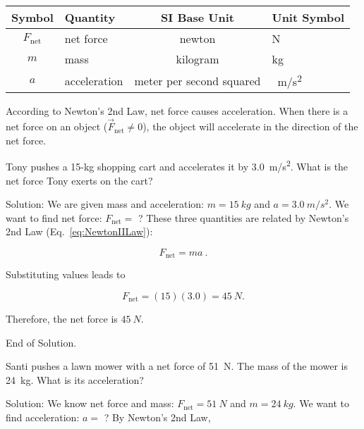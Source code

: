 \documentclass{article}
\begin{document}
\begin{center}
    \begin{tabular}{cl|cl}
    \hline
    \textbf{Symbol} & \textbf{Quantity} & \textbf{SI Base Unit} & \textbf{Unit Symbol}  \\
    \hline\hline
    \rule{0pt}{2.5ex}
        $F_{\mathrm{net}}$ & net force & newton & N\\
        $m$ & mass & kilogram & kg\\
        $a$ & acceleration & meter per second squared & \SI{}{m/s^2}\\
    \hline
    \end{tabular}
\end{center}

According to Newton's 2nd Law, net force causes acceleration. When there is a net force on an object ($\vec{F}_{\text{net}} \neq 0$), the object will accelerate in the direction of the net force.


\begin{example} \label{ex:NetForce_Tony}
Tony pushes a 15-kg shopping cart and accelerates it by \SI{3.0}{m/s^2}. What is the net force Tony exerts on the cart?
\end{example}

Solution: We are given mass and acceleration: $m = \SI{15}{kg}$ and $a = \SI{3.0}{m/s^2}$. We want to find net force: $F_{\text{net}} =$ ? These three quantities are related by Newton's 2nd Law (Eq.~\ref{eq:NewtonIILaw}):

\begin{equation*}
    F_{\text{net}} = m a\ .
\end{equation*}

Substituting values leads to

\begin{equation*}
    F_{\text{net}} = (15)(3.0) = \SI{45}{N}.
\end{equation*}

Therefore, the net force is $\SI{45}{N}$. 

End of Solution.

\begin{example} \label{ex:Solve_NIIL_a}
Santi pushes a lawn mower with a net force of \SI{51}{N}. The mass of the mower is \SI{24}{kg}. What is its acceleration?
\end{example}

Solution: We know net force and mass: $F_{\mathrm{net}} = \SI{51}{N}$ and $m = \SI{24}{kg}$. We want to find acceleration: $a =$ ? By Newton's 2nd Law,
\end{document}
